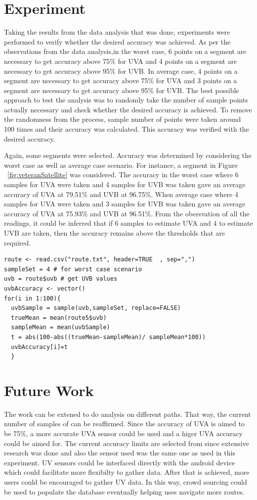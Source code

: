 \documentclass[10pt]{sigplan-proc-varsize}
\begin{document}
\section{Experiment}
Taking the results from the data analysis that was done, experiments were performed to verify whether the desired accuracy was achieved. As per the observations from the data analysis,in the worst case, 6 points on a segment are necessary to get accuracy above 75\% for UVA and 4 points on a segment are necessary to get accuracy above 95\% for UVB.
In average case, 4 points on a segment are necessary to get accuracy above 75\% for UVA and  3 points on a segment are necessary to get accuracy above 95\% for UVB. The best possible approach to test the analysis was to randomly take the number of sample points actually necessary and check whether the desired accuracy is achieved. To remove the randomness from the process, sample number of points were taken around 100 times and their accuracy was calculated. This accuracy was verified with the desired accuracy. 

Again, some segments were selected. Accuracy was determined by considering the worst case as well as average case scenario. For instance, a segment in Figure ~\ref{fig:veteranSatellite} was considered. The accuracy in the worst case where 6 samples for UVA were taken and 4 samples for UVB was taken gave an average accuracy of UVA at 79.51\% and UVB at 96.75\%. When average case where 4 samples for UVA were taken and 3 samples for UVB was taken gave an average accuracy of UVA at 75.93\% and UVB at 96.51\%. From the obersvation of all the readings, it could be inferred that if 6 samples to estimate UVA and 4 to estimate UVB are taken, then the accuracy remains above the thresholds that are required.
\lstset{ tabsize=4,      caption=R Code for verifying accuracy,breaklines=true,
        frame=single}
\begin{lstlisting}
route <- read.csv("route.txt", header=TRUE  , sep=",")
sampleSet = 4 # for worst case scenario
uvb = route$uvb # get UVB values
uvbAccuracy <- vector()
for(i in 1:100){
  uvbSample = sample(uvb,sampleSet, replace=FALSE)
  trueMean = mean(route5$uvb)
  sampleMean = mean(uvbSample)
  t = abs(100-abs((trueMean-sampleMean)/ sampleMean*100))
  uvbAccuracy[i]=t
  }
\end{lstlisting}

\section{Future Work}
The work can be extened to do analysis on different paths. That way, the current number of samples of can be reaffirmed. Since the accuracy of UVA is aimed to be 75\%, a more accurate UVA sensor could be used and a higer UVA accuracy could be aimed for. The current accuracy limits are selected from \cite{uvguardian} since extensive research was done and also the sensor used was the same one as used in this experiment. UV sensors could be interfaced directly with the android device which could facilitate more flexibilty to gather data. After that is achieved, more users could be encouraged to gather UV data. In this way, crowd sourcing could be used to populate the database eventually helping uses navigate more routes.
\end{document}
